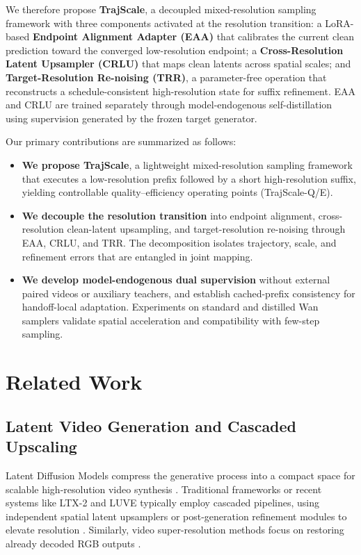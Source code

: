 We therefore propose \textbf{TrajScale}, a decoupled mixed-resolution sampling
framework with three components activated at the resolution transition: a
LoRA-based \textbf{Endpoint Alignment Adapter (EAA)} that calibrates the current
clean prediction toward the converged low-resolution endpoint; a
\textbf{Cross-Resolution Latent Upsampler (CRLU)} that maps clean latents across
spatial scales; and \textbf{Target-Resolution Re-noising (TRR)}, a
parameter-free operation that reconstructs a schedule-consistent
high-resolution state for suffix refinement. EAA and CRLU are trained separately
through model-endogenous self-distillation using supervision generated by the
frozen target generator.

Our primary contributions are summarized as follows:
\begin{itemize}
\item \textbf{We propose TrajScale}, a lightweight mixed-resolution sampling framework that executes a low-resolution prefix followed by a short high-resolution suffix, yielding controllable quality--efficiency operating points (TrajScale-Q/E).
\item \textbf{We decouple the resolution transition} into endpoint alignment, cross-resolution clean-latent upsampling, and target-resolution re-noising through EAA, CRLU, and TRR. The decomposition isolates trajectory, scale, and refinement errors that are entangled in joint mapping.
\item \textbf{We develop model-endogenous dual supervision} without external paired videos or auxiliary teachers, and establish cached-prefix consistency for handoff-local adaptation. Experiments on standard and distilled Wan samplers validate spatial acceleration and compatibility with few-step sampling.
\end{itemize}

\section{Related Work}

\subsection{Latent Video Generation and Cascaded Upscaling}
Latent Diffusion Models compress the generative process into a compact space for scalable high-resolution video synthesis \citep{rombach2022ldm}. Traditional frameworks or recent systems like LTX-2 and LUVE typically employ cascaded pipelines, using independent spatial latent upsamplers or post-generation refinement modules to elevate resolution \citep{blattmann2023videoldm, hacohen2026ltx2, zhao2026luve}. Similarly, video super-resolution methods focus on restoring already decoded RGB outputs \citep{zhou2024upscale, xu2024videogigagan}.

